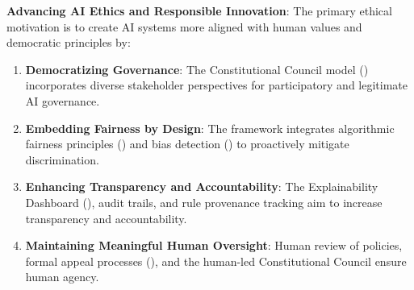 \documentclass[manuscript,screen,9pt]{acmart}
\begin{document}
\textbf{Advancing AI Ethics and Responsible Innovation}:
The primary ethical motivation is to create AI systems more aligned with human values and democratic principles by:
\begin{enumerate}[leftmargin=*,itemsep=1pt,parsep=1pt]
    \item \textbf{Democratizing Governance}: The Constitutional Council model () incorporates diverse stakeholder perspectives for participatory and legitimate AI governance.
    \item \textbf{Embedding Fairness by Design}: The framework integrates algorithmic fairness principles () and bias detection () to proactively mitigate discrimination.
    \item \textbf{Enhancing Transparency and Accountability}: The Explainability Dashboard (), audit trails, and rule provenance tracking aim to increase transparency and accountability.
    \item \textbf{Maintaining Meaningful Human Oversight}: Human review of policies, formal appeal processes (), and the human-led Constitutional Council ensure human agency.
\end{enumerate}
\end{document}
